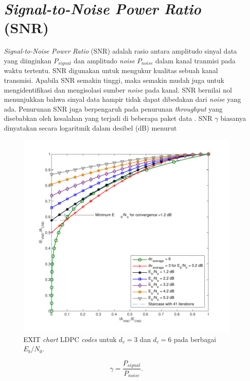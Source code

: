 \section{\textit{Signal-to-Noise Power Ratio} (SNR)}
\textit{Signal-to-Noise Power Ratio} (SNR) adalah rasio antara amplitudo sinyal data yang diinginkan $P_{signal}$ dan amplitudo \textit{noise} $P_{noise}$ dalam kanal tranmisi pada waktu tertentu. SNR digunakan untuk mengukur kualitas sebuah kanal transmisi. Apabila SNR semakin tinggi, maka semakin mudah juga untuk mengidentifikasi dan mengisolasi sumber \textit{noise} pada kanal. SNR bernilai nol menunjukkan bahwa sinyal data hampir tidak dapat dibedakan dari \textit{noise} yang ada. Penurunan SNR juga berpengaruh pada penurunan \textit{throughput} yang disebabkan oleh kesalahan yang terjadi di beberapa paket data \cite{SNR}. SNR $\gamma$ biasanya dinyatakan secara logaritmik dalam desibel (dB) menurut
\begin{figure}[b!]
	\centering	
	\includegraphics[width=1\textwidth]
	{pics/exit.pdf}
	\caption{EXIT \textit{chart} LDPC \textit{codes} untuk $d_{v}=3$ dan $d_{c}=6$ pada berbagai $E_b/N_0$.}
	\label{fig:EXIT chart}
\end{figure}
\begin{equation}
	\gamma = \frac{P_{signal}}{P_{noise}}.
\end{equation}


